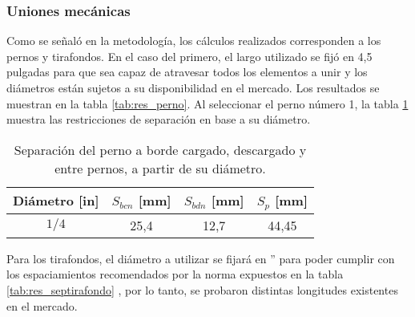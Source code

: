 \subsubsection{Uniones mecánicas}

Como se señaló en la metodología, los cálculos realizados corresponden a los pernos y tirafondos. En el caso del primero, el largo utilizado se fijó en 4,5 pulgadas para que sea capaz de atravesar todos los elementos a unir y los diámetros están sujetos a su disponibilidad en el mercado. Los resultados se muestran en la tabla \ref{tab:res_perno}. Al seleccionar el perno número 1, la tabla \ref{tab:res_seppernos} muestra las restricciones de separación en base a su diámetro.

\begin{table}[h]
\centering
{}
\caption{Cargas admisibles y factor de seguridad para distintos pernos hexagonales.}
\label{tab:res_perno}
\end{table}

\begin{table}[h]
\centering
\begin{tabular}{@{}cccc@{}}
\toprule
Diámetro [in] & $S_{bcn}$ [mm] & $S_{bdn}$ [mm] & $S_p$ [mm] \\ \midrule
$1/4$ & 25,4 & 12,7 & 44,45 \\ \bottomrule
\end{tabular}
\caption{Separación del perno a borde cargado, descargado y entre pernos, a partir de su diámetro.}
\label{tab:res_seppernos}
\end{table}

Para los tirafondos, el diámetro a utilizar se fijará en '' para poder cumplir con los espaciamientos recomendados  por la norma expuestos en la tabla \ref{tab:res_septirafondo} , por lo tanto, se probaron distintas longitudes existentes en el mercado.

